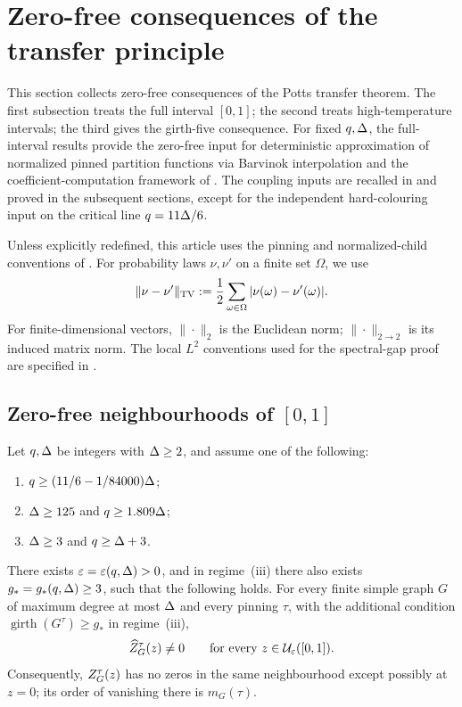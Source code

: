\section{Zero-free consequences of the transfer principle}
\label{app:additional-potts}\label{sec:additional-potts-results}

This section collects zero-free consequences of the Potts transfer theorem.
The first subsection treats the full interval \([0,1]\); the second treats
high-temperature intervals; the third gives the girth-five consequence.
For fixed \(q,\Delta\), the full-interval results provide the zero-free input
for deterministic approximation of normalized pinned partition functions
via Barvinok interpolation and the coefficient-computation framework
of \cite{Barvinok2016,PatelRegts2017}.
The coupling inputs are recalled in  and proved in the subsequent
sections, except for the independent hard-colouring input on the critical line
\(q=11\Delta/6\).

Unless explicitly redefined, this article uses the pinning and normalized-child
conventions of .  For probability laws \(\nu,\nu'\) on a
finite set \(\Omega\), we use
\[
 \|\nu-\nu'\|_{\rm TV}:=\frac12\sum_{\omega\in\Omega}
       |\nu(\omega)-\nu'(\omega)|.
\]
For finite-dimensional vectors, \(\|\cdot\|_2\) is the Euclidean norm;
\(\|\cdot\|_{2\to2}\) is its induced matrix norm.  The local
\(L^2\) conventions used for the spectral-gap proof are specified in
.

\subsection{Zero-free neighbourhoods of \texorpdfstring{\([0,1]\)}{[0,1]}}

\begin{theorem}
\label{thm:additional-potts-zf}
Let \(q,\Delta\) be integers with \(\Delta\ge2\), and assume one of the
following:
\begin{enumerate}[label=\textup{(\roman*)},leftmargin=2.2em]
  \item\label{case:intro-near-vigoda}
        \(q\ge(11/6-1/84000)\Delta\);
  \item\label{case:intro-1809}
        \(\Delta\ge125\) and \(q\ge1.809\Delta\);
  \item\label{case:intro-large-girth}
        \(\Delta\ge3\) and \(q\ge\Delta+3\).
\end{enumerate}
There exists \(\varepsilon=\varepsilon(q,\Delta)>0\), and in
regime~\textup{(iii)} there also exists
\(g_*=g_*(q,\Delta)\ge3\), such that the following holds.  For every finite
simple graph \(G\) of maximum degree at most \(\Delta\) and every pinning
\(\tau\), with the additional condition
\(\operatorname{girth}(G^\tau)\ge g_*\) in regime~\textup{(iii)},
\[
  \widehat Z_{G}^{\tau}(z)\ne0
  \qquad\text{for every }z\in\mathcal U_\varepsilon([0,1]).
\]
Consequently, \(Z_{G}^{\tau}(z)\) has no zeros in the same neighbourhood
except possibly at \(z=0\); its order of vanishing there is
\(m_G(\tau)\).
\end{theorem}

